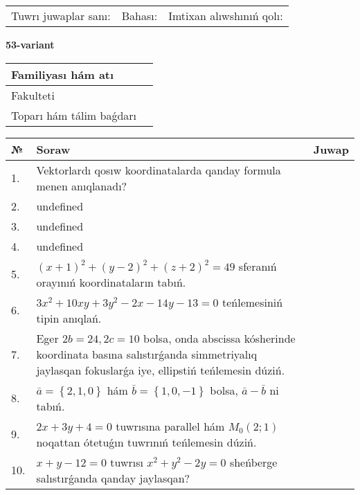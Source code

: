 \documentclass{article}
\begin{document}
\vspace{0.7cm}

\begin{tabular}{lll}
Tuwrı juwaplar sanı: \underline{\hspace{1cm}} & 
Bahası: \underline{\hspace{1cm}} & 
Imtixan alıwshınıń qolı: \underline{\hspace{2cm}} \\
\end{tabular}

\egroup

\newpage


\textbf{53-variant}\\

\bgroup
\def\arraystretch{1.6} %

\begin{tabular}{|m{5.7cm}|m{9.5cm}|}
\hline
Familiyası hám atı & \\
\hline
Fakulteti  & \\
\hline
Toparı hám tálim baǵdarı  & \\
\hline
\end{tabular}

\vspace{0.7cm}

\begin{tabular}{|m{0.7cm}|m{10cm}|m{4cm}|}
\hline
№ & Soraw & Juwap \\
\hline
1. & Vektorlardı qosıw koordinatalarda qanday formula menen anıqlanadı? &  \\
\hline
2. & undefined &  \\
\hline
3. & undefined &  \\
\hline
4. & undefined &  \\
\hline
5. & \((x + 1) ^{2} + (y - 2) ^{2} + (z + 2) ^{2} = 49\) sferanıń orayınıń koordinataların tabıń. &  \\
\hline
6. & \(3 x^{2} + 10 xy + 3 y^{2} - 2 x - 14 y - 13 = 0\) teńlemesiniń tipin anıqlań. &  \\
\hline
7. & Eger \(2 b = 24, 2 c = 10\) bolsa, onda abscissa kósherinde koordinata basına salıstırǵanda simmetriyalıq jaylasqan fokuslarǵa iye, ellipstiń teńlemesin dúziń. &  \\
\hline
8. & \(\bar{a} = \left\{ 2, 1, 0 \right\}\) hám \(\bar{b} = \left\{ 1, 0,- 1 \right\}\) bolsa, \(\bar{a} - \bar{b}\) ni tabıń. &  \\
\hline
9. & \(2 x + 3 y + 4 = 0\) tuwrısına parallel hám \(M_{0} (2;1)\) noqattan ótetuǵın tuwrınıń teńlemesin dúziń. &  \\
\hline
10. & \(x + y - 12 = 0\) tuwrısı \(x^{2} + y^{2} - 2 y = 0\) sheńberge salıstırǵanda qanday jaylasqan? & \\
\hline
\end{tabular}
\end{document}
